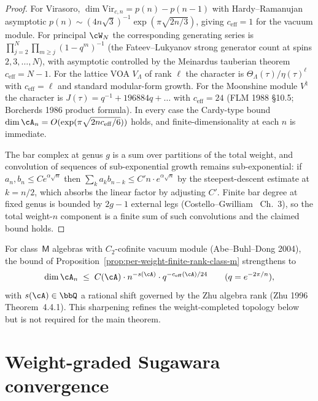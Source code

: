 \begin{proof}
For Virasoro, $\dim \mathrm{Vir}_{c, n} = p(n) - p(n-1)$ with
Hardy--Ramanujan asymptotic
$p(n) \sim (4 n \sqrt{3})^{-1} \exp(\pi \sqrt{2n/3})$, giving
$c_{\mathrm{eff}} = 1$ for the vacuum module. For principal $\cW_N$
the corresponding generating series is $\prod_{j = 2}^{N}
\prod_{m \ge j} (1 - q^m)^{-1}$ (the Fateev--Lukyanov strong
generator count at spins $2, 3, \ldots, N$), with asymptotic controlled
by the Meinardus tauberian theorem
$c_{\mathrm{eff}} = N - 1$. For the lattice VOA $V_\Lambda$ of rank
$\ell$ the character is
$\Theta_\Lambda(\tau) / \eta(\tau)^\ell$ with
$c_{\mathrm{eff}} = \ell$ and standard modular-form growth. For the
Moonshine module $V^{\natural}$ the character is
$J(\tau) = q^{-1} + 196884 q + \ldots$ with $c_{\mathrm{eff}} = 24$
(FLM 1988 \S 10.5; Borcherds 1986 product formula). In every case the
Cardy-type bound
$\dim \cA_n = O(\exp(\pi \sqrt{2 n c_{\mathrm{eff}} / 6}))$
holds, and finite-dimensionality at each $n$ is immediate.

The bar complex at genus $g$ is a sum over partitions of the total
weight, and convolution of sequences of sub-exponential growth remains
sub-exponential: if $a_n, b_n \le C e^{\alpha \sqrt{n}}$ then
$\sum_{k} a_k b_{n - k} \le C' n \cdot e^{\alpha \sqrt{n}}$ by the
steepest-descent estimate at $k = n/2$, which absorbs the linear factor
by adjusting $C'$. Finite bar degree at fixed genus is bounded by
$2 g - 1$ external legs (Costello--Gwilliam~\cite{CG21} Ch.~3), so the
total weight-$n$ component is a finite sum of such convolutions and the
claimed bound holds.
\end{proof}

\begin{remark}
\label{rem:abe-buhl-dong-c2-cofinite}
For class~$\mathsf{M}$ algebras with $C_2$-cofinite vacuum module
(Abe--Buhl--Dong 2004), the bound of
Proposition~\ref{prop:per-weight-finite-rank-class-m} strengthens to
\[
 \dim \cA_n
 \;\le\;
 C(\cA) \cdot n^{-s(\cA)} \cdot q^{-c_{\mathrm{eff}}(\cA) / 24}
 \qquad (q = e^{-2 \pi / n}),
\]
with $s(\cA) \in \bbQ$ a rational shift governed by the Zhu algebra
rank (Zhu 1996 Theorem~4.4.1). This sharpening refines the
weight-completed topology below but is not required for the main
theorem.
\end{remark}

\section{Weight-graded Sugawara convergence}
\label{sec:weight-completed-sugawara-convergence}

